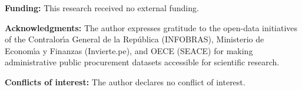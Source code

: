 \documentclass[10pt,a4paper]{article}
\begin{document}
\noindent\textbf{Funding:} This research received no external funding.
\vspace{0.2cm}

\noindent\textbf{Acknowledgments:} The author expresses gratitude to the open-data initiatives of the Contralor{\'\i}a General de la Rep{\'u}blica (INFOBRAS), Ministerio de Econom{\'\i}a y Finanzas (Invierte.pe), and OECE (SEACE) for making administrative public procurement datasets accessible for scientific research.
\vspace{0.2cm}

\noindent\textbf{Conflicts of interest:} The author declares no conflict of interest.



\end{document}
